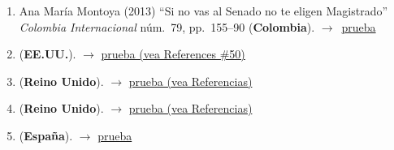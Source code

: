 \documentclass[12 pt, letter]{article}
\newenvironment{CitasMiTrabajo}{
    \begin{footnotesize}
    \begin{enumerate}[label={\footnotesize\emph{cita~\arabic*}},ref=\arabic*] %
        \setlength{\itemsep}{.1\itemsep}
        \setlength{\parskip}{.1\parskip}
    }{\end{enumerate}\end{footnotesize}}
\begin{document}
\begin{CitasMiTrabajo}
        \item Ana Mar\'ia Montoya (2013) ``Si no vas al Senado no te eligen Magistrado'' \emph{Colombia Internacional} n\'um.~79, pp.~155--90 (\textbf{Colombia}). $\rightarrow$~\href{https://github.com/emagar/cv/blob/master/citasMiTrab/sanchMagalMagarChapter/montoya2013.pdf}{prueba}

        \item {} (\textbf{EE.UU.}). $\rightarrow$ \href{https://www.tandfonline.com/doi/ref/10.1080/13510347.2017.1304379}{prueba (vea References \#50)}

        \item {} (\textbf{Reino Unido}). $\rightarrow$ \href{https://www.cambridge.org/core/journals/asian-journal-of-law-and-society/article/measuring-judicial-ideal-points-in-new-democracies-the-case-of-the-philippines/8E51C7D52349D1B554D2F2C33D347EC9}{prueba (vea Referencias)}

        \item {} (\textbf{Reino Unido}). $\rightarrow$ \href{https://www.cambridge.org/core/journals/british-journal-of-political-science/article/judicial-instability-and-endogenous-constitutional-change-lessons-from-latin-america/60789D239F907B3584DA3DB1D4EC431D}{prueba (vea Referencias)}

        \item {} (\textbf{Espa\~na}). $\rightarrow$ \href{http://dx.doi.org/10.18042/cepc/aijc.20.03}{prueba}
          
        \label{ncites:sanchez.magaloni.magar.2011} %

        
        \end{CitasMiTrabajo}





\end{document}
